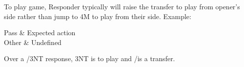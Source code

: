 \documentclass[tom-jenni]{subfiles}
\begin{document}
To play game, Responder typically will raise the transfer to play from opener's side rather than jump to 4M to play from their side.  Example:

\begin{bidtable}{
\begin{auctionhead}
\end{auctionhead}
}
Pass & Expected action \\
Other & Undefined \\
\end{bidtable}

Over a /3NT response, 3NT is to play and /\hhh is a transfer.
\end{document}
